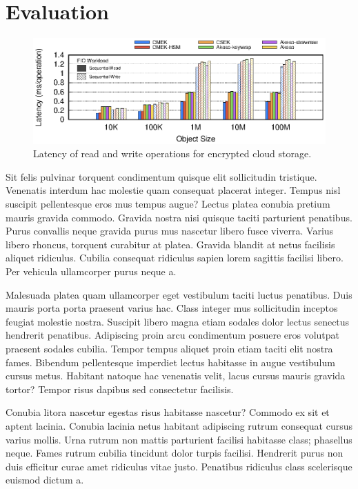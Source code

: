 \section{Evaluation}
\label{sec:evaluation}

\begin{figure}
    \centering
    \includegraphics[width=\textwidth]{figs/fsop-latency-hist-2col}
    \caption{Latency of read and write operations for encrypted cloud storage.}
    \label{fig:fsop-latency-hist-2col}
\end{figure}

Sit felis pulvinar torquent condimentum quisque elit sollicitudin tristique.
Venenatis interdum hac molestie quam consequat placerat integer. Tempus nisl
suscipit pellentesque eros mus tempus augue? Lectus platea conubia pretium
mauris gravida commodo. Gravida nostra nisi quisque taciti parturient
penatibus. Purus convallis neque gravida purus mus nascetur libero fusce
viverra. Varius libero rhoncus, torquent curabitur at platea. Gravida blandit
at netus facilisis aliquet ridiculus. Cubilia consequat ridiculus sapien lorem
sagittis facilisi libero. Per vehicula ullamcorper purus neque a.

Malesuada platea quam ullamcorper eget vestibulum taciti luctus penatibus. Duis
mauris porta porta praesent varius hac. Class integer mus sollicitudin inceptos
feugiat molestie nostra. Suscipit libero magna etiam sodales dolor lectus
senectus hendrerit penatibus. Adipiscing proin arcu condimentum posuere eros
volutpat praesent sodales cubilia. Tempor tempus aliquet proin etiam taciti
elit nostra fames. Bibendum pellentesque imperdiet lectus habitasse in augue
vestibulum cursus metus. Habitant natoque hac venenatis velit, lacus cursus
mauris gravida tortor? Tempor risus dapibus sed consectetur facilisis.

Conubia litora nascetur egestas risus habitasse nascetur? Commodo ex sit et
aptent lacinia. Conubia lacinia netus habitant adipiscing rutrum consequat
cursus varius mollis. Urna rutrum non mattis parturient facilisi habitasse
class; phasellus neque. Fames rutrum cubilia tincidunt dolor turpis facilisi.
Hendrerit purus non duis efficitur curae amet ridiculus vitae justo. Penatibus
ridiculus class scelerisque euismod dictum a.

